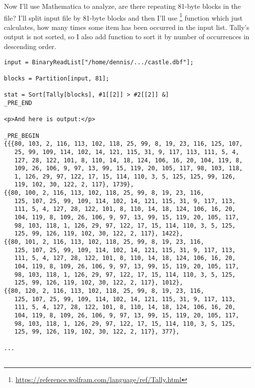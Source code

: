 Now I'll use Mathematica to analyze, are there repeating 81-byte blocks in the file?
I'll split input file by 81-byte blocks and then I'll use 
\footnote{\url{https://reference.wolfram.com/language/ref/Tally.html}}
function which just calculates, how many times some item has been occurred in the input list.
Tally's output is not sorted, so I also add  function to sort it by number of occurrences in descending order.

\begin{lstlisting}
input = BinaryReadList["/home/dennis/.../castle.dbf"];

blocks = Partition[input, 81];

stat = Sort[Tally[blocks], #1[[2]] > #2[[2]] &]
_PRE_END

<p>And here is output:</p>

_PRE_BEGIN
{{{80, 103, 2, 116, 113, 102, 118, 25, 99, 8, 19, 23, 116, 125, 107, 
   25, 99, 109, 114, 102, 14, 121, 115, 31, 9, 117, 113, 111, 5, 4, 
   127, 28, 122, 101, 8, 110, 14, 18, 124, 106, 16, 20, 104, 119, 8, 
   109, 26, 106, 9, 97, 13, 99, 15, 119, 20, 105, 117, 98, 103, 118, 
   1, 126, 29, 97, 122, 17, 15, 114, 110, 3, 5, 125, 125, 99, 126, 
   119, 102, 30, 122, 2, 117}, 1739}, 
{{80, 100, 2, 116, 113, 102, 118, 25, 99, 8, 19, 23, 116, 
   125, 107, 25, 99, 109, 114, 102, 14, 121, 115, 31, 9, 117, 113, 
   111, 5, 4, 127, 28, 122, 101, 8, 110, 14, 18, 124, 106, 16, 20, 
   104, 119, 8, 109, 26, 106, 9, 97, 13, 99, 15, 119, 20, 105, 117, 
   98, 103, 118, 1, 126, 29, 97, 122, 17, 15, 114, 110, 3, 5, 125, 
   125, 99, 126, 119, 102, 30, 122, 2, 117}, 1422}, 
{{80, 101, 2, 116, 113, 102, 118, 25, 99, 8, 19, 23, 116, 
   125, 107, 25, 99, 109, 114, 102, 14, 121, 115, 31, 9, 117, 113, 
   111, 5, 4, 127, 28, 122, 101, 8, 110, 14, 18, 124, 106, 16, 20, 
   104, 119, 8, 109, 26, 106, 9, 97, 13, 99, 15, 119, 20, 105, 117, 
   98, 103, 118, 1, 126, 29, 97, 122, 17, 15, 114, 110, 3, 5, 125, 
   125, 99, 126, 119, 102, 30, 122, 2, 117}, 1012},
{{80, 120, 2, 116, 113, 102, 118, 25, 99, 8, 19, 23, 116, 
   125, 107, 25, 99, 109, 114, 102, 14, 121, 115, 31, 9, 117, 113, 
   111, 5, 4, 127, 28, 122, 101, 8, 110, 14, 18, 124, 106, 16, 20, 
   104, 119, 8, 109, 26, 106, 9, 97, 13, 99, 15, 119, 20, 105, 117, 
   98, 103, 118, 1, 126, 29, 97, 122, 17, 15, 114, 110, 3, 5, 125, 
   125, 99, 126, 119, 102, 30, 122, 2, 117}, 377},

...


\end{lstlisting}
